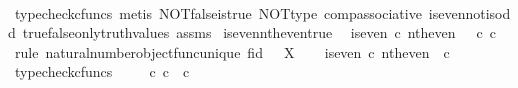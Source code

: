 \begin{isabellebody}
%
\isadelimproof
\ \ %
\endisadelimproof
%
\isatagproof
{}\isamarkupfalse%
\ {\isacharparenleft}{\kern0pt}typecheck{\isacharunderscore}{\kern0pt}cfuncs{\isacharcomma}{\kern0pt}\ metis\ NOT{\isacharunderscore}{\kern0pt}false{\isacharunderscore}{\kern0pt}is{\isacharunderscore}{\kern0pt}true\ NOT{\isacharunderscore}{\kern0pt}type\ comp{\isacharunderscore}{\kern0pt}associative{}\ is{\isacharunderscore}{\kern0pt}even{\isacharunderscore}{\kern0pt}not{\isacharunderscore}{\kern0pt}is{\isacharunderscore}{\kern0pt}odd\ true{\isacharunderscore}{\kern0pt}false{\isacharunderscore}{\kern0pt}only{\isacharunderscore}{\kern0pt}truth{\isacharunderscore}{\kern0pt}values\ assms{\isacharparenright}{\kern0pt}%
\endisatagproof
{\isafoldproof}%
%
\isadelimproof
\isanewline
%
\endisadelimproof
\isanewline
{}\isamarkupfalse%
\ is{\isacharunderscore}{\kern0pt}even{\isacharunderscore}{\kern0pt}nth{\isacharunderscore}{\kern0pt}even{\isacharunderscore}{\kern0pt}true{\isacharcolon}{\kern0pt}\isanewline
\ \ {\isachardoublequoteopen}is{\isacharunderscore}{\kern0pt}even\ {\isasymcirc}\isactrlsub c\ nth{\isacharunderscore}{\kern0pt}even\ {\isacharequal}{\kern0pt}\ {\isasymt}\ {\isasymcirc}\isactrlsub c\ {\isasymbeta}\isactrlbsub {\isasymnat}\isactrlsub c\isactrlesub {\isachardoublequoteclose}\isanewline
%
\isadelimproof
%
\endisadelimproof
%
\isatagproof
{}\isamarkupfalse%
\ {\isacharparenleft}{\kern0pt}rule\ natural{\isacharunderscore}{\kern0pt}number{\isacharunderscore}{\kern0pt}object{\isacharunderscore}{\kern0pt}func{\isacharunderscore}{\kern0pt}unique{\isacharbrackleft}{\kern0pt}\ f{\isacharequal}{\kern0pt}{\isachardoublequoteopen}id\ {\isasymOmega}{\isachardoublequoteclose}{\isacharcomma}{\kern0pt}\ \ X{\isacharequal}{\kern0pt}{\isasymOmega}{\isacharbrackright}{\kern0pt}{\isacharparenright}{\kern0pt}\isanewline
\ \ \isamarkupfalse%
\ {\isachardoublequoteopen}is{\isacharunderscore}{\kern0pt}even\ {\isasymcirc}\isactrlsub c\ nth{\isacharunderscore}{\kern0pt}even\ {\isacharcolon}{\kern0pt}\ {\isasymnat}\isactrlsub c\ {\isasymrightarrow}\ {\isasymOmega}{\isachardoublequoteclose}\isanewline
\ \ \ \ \isamarkupfalse%
\ typecheck{\isacharunderscore}{\kern0pt}cfuncs\isanewline
\ \ \isamarkupfalse%
\ {\isachardoublequoteopen}{\isasymt}\ {\isasymcirc}\isactrlsub c\ {\isasymbeta}\isactrlbsub {\isasymnat}\isactrlsub c\isactrlesub \ {\isacharcolon}{\kern0pt}\ {\isasymnat}\isactrlsub c\ {\isasymrightarrow}\ {\isasymOmega}{\isachardoublequoteclose}\isanewline

\end{isabellebody}
